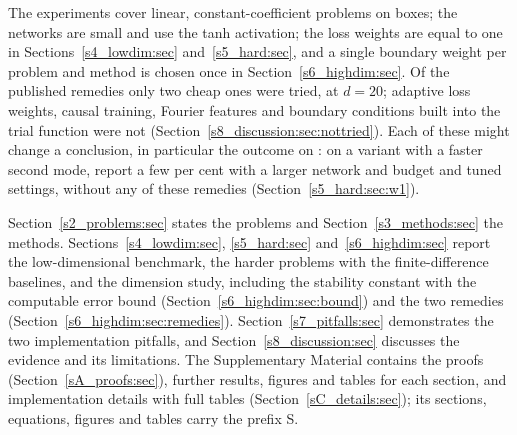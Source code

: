 The experiments cover linear, constant-coefficient problems on boxes; the
networks are small and use the tanh activation; the loss weights are equal to one in
Sections~\ref{s4_lowdim:sec} and~\ref{s5_hard:sec}, and a single boundary weight per problem
and method is chosen once in Section~\ref{s6_highdim:sec}. Of the published remedies only two
cheap ones were tried, at $d=20$; adaptive loss weights, causal training, Fourier features and
boundary conditions built into the trial function were not
(Section~\ref{s8_discussion:sec:nottried}). Each of these might change a conclusion, in
particular the outcome on \PWone:
on a variant with a faster second mode, \citet{rathore2024} report a few per cent with a
larger network and budget and tuned settings, without any of these remedies
(Section~\ref{s5_hard:sec:w1}).

Section~\ref{s2_problems:sec} states the problems and Section~\ref{s3_methods:sec} the
methods. Sections~\ref{s4_lowdim:sec}, \ref{s5_hard:sec} and~\ref{s6_highdim:sec} report
the low-dimensional benchmark, the harder problems with the finite-difference baselines,
and the dimension study, including the stability constant with the computable error bound
(Section~\ref{s6_highdim:sec:bound}) and the two remedies
(Section~\ref{s6_highdim:sec:remedies}). Section~\ref{s7_pitfalls:sec} demonstrates the two
implementation pitfalls, and Section~\ref{s8_discussion:sec} discusses the evidence and its
limitations. The Supplementary Material contains the proofs
(Section~\ref{sA_proofs:sec}), further results, figures and tables for each section, and
implementation details with full tables (Section~\ref{sC_details:sec}); its sections,
equations, figures and tables carry the prefix S.
